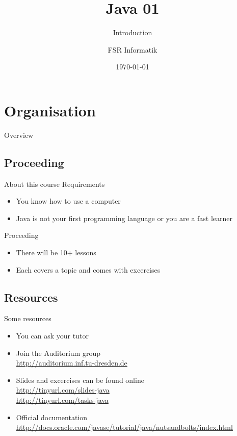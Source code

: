 

\title{Java 01}
\subtitle{Introduction}
\author{FSR Informatik}
\date{\today}



\section{Organisation}
\begin{frame}
	\titlepage
\end{frame}
\begin{frame}{Overview}
	\tableofcontents
\end{frame}

\subsection{Proceeding}
\begin{frame}{About this course}
	Requirements
	\begin{itemize}
		\item You know how to use a computer
		\item Java is not your first programming language or you are a fast learner
	\end{itemize}
	Proceeding
	\begin{itemize}
		\item There will be 10+ lessons
		\item Each covers a topic and comes with excercises
	\end{itemize}
\end{frame}

\subsection{Resources}
\begin{frame}{Some resources}
	\begin{itemize}
		\item You can ask your tutor
		\item Join the Auditorium group \hfill \\
			\url{http://auditorium.inf.tu-dresden.de}
		\item Slides and excercises can be found online \hfill \\
			\url{http://tinyurl.com/slides-java} \\
			\url{http://tinyurl.com/tasks-java}
		\item Official documentation \hfill \\
			\url{http://docs.oracle.com/javase/tutorial/java/nutsandbolts/index.html}
	\end{itemize}
\end{frame}

